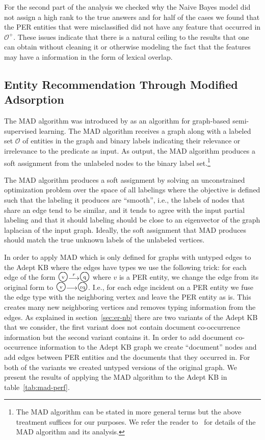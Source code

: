 \documentclass[paper=a4,fontsize=11pt]{scrartcl}
\newcommand{\ie}{i.e.,\xspace}
\newcommand{\Ie}{I.e.,\xspace}
\newcommand{\secref}[1]{section~\ref{#1}}
\newcommand{\tabref}[1]{table~\ref{#1}}
\numberwithin{equation}{section}    %
\numberwithin{figure}{section}      %
\numberwithin{table}{section}       %
\def\overstrike#1#2{{\setbox0\hbox{$#2$}\hbox to \wd0{\hss$#1$\hss}\kern-\wd0\box0}}
\newcommand{\bigstaten}[1]{\overstrike{\protect\raisebox{1pt}{\mbox{\scriptsize #1}}}{\mbox{\Large $\bigcirc$}}}
\newcommand{\shortarc}[1]{\protect\raisebox{-1pt}{$\stackrel{#1}{\longrightarrow}$}}
\begin{document}
For the second part of the analysis we checked why the Naive Bayes model did
not assign a high rank
to the true answers and for half of the cases we found that the \textsc{PER}
entities that were misclassified did not have any feature that occurred in $\mathcal{O}^{+}$.
These issues indicate that there is a natural ceiling to the results that one can obtain without
cleaning it or otherwise modeling the fact that the features may have a information in the form of lexical overlap.

\subsection{Entity Recommendation Through Modified Adsorption}
\label{sec:er-lp}
The MAD algorithm was introduced by \citep{talukdar2009new} as an algorithm
for graph-based semi-supervised learning. The MAD algorithm receives a graph along with
a labeled set $\mathcal{O}$ of entities in the graph and binary labels indicating
their relevance or irrelevance to the predicate as input. As output, the MAD algorithm
produces a soft assignment from the unlabeled nodes to the binary label set.\footnote{The MAD algorithm can be stated in more general terms but the above treatment suffices for our purposes. We refer the reader to~\citep{talukdar2009new} for details of the MAD algorithm
and its analysis.}

The MAD algorithm produces a soft assignment by solving an unconstrained
optimization problem over the space of all labelings where the objective
is defined such that the labeling it produces are ``smooth'', \ie the
labels of nodes that share an edge tend to be similar, and it tends to agree with
the input partial labeling and that it should labeling should be close to an
eigenvector of the graph laplacian of the input graph.
Ideally, the soft assignment that MAD produces should match the true
unknown labels of the unlabeled vertices.

In order to apply MAD which is only defined for graphs with untyped edges to the
Adept KB where the edges have types we use the following trick:
for each edge of the form $\bigstaten{v} \shortarc{r} \bigstaten{q}$ where $v$
is a \textsc{PER} entity, we change the edge from its original form to
$\bigstaten{v} \shortarc{} \bigstaten{rq}$. \Ie for each edge incident on a
\textsc{PER} entity we fuse the edge type with the neighboring vertex and leave
the \textsc{PER} entity as is. This creates many new neighboring vertices and
removes typing information from the edges.
As explained in \secref{sec:er-nb} there are two variants of the Adept KB that
we consider, the first variant does not contain document co-occurrence
information but the second variant contains it.
In order to add document co-occurrence information to the Adept KB
graph we create ``document'' nodes and add edges between \textsc{PER} entities
and the documents that they occurred in. For both of the variants we created
untyped versions of the original graph. We present the results of applying the
MAD algorithm to the Adept KB in \tabref{tab:mad-perf}.
\end{document}
